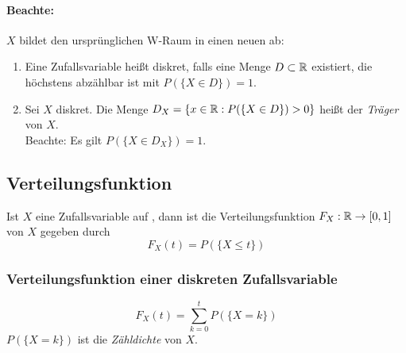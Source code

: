 
\paragraph{Beachte:}
$X$ bildet den ursprünglichen W-Raum in einen neuen ab:
\begin{center}
\end{center}

\begin{definition}
    \begin{enumerate}
        \item Eine Zufallsvariable heißt diskret, falls eine Menge $D \subset \mathbb{R}$
              existiert, die höchstens abzählbar ist mit $P(\{X \in D\})=1$.
        \item Sei $X$ diskret. Die Menge $D_X = \{ x \in \mathbb{R}: P(\{X \in D\})>0 \}$
              heißt der \emph{Träger} von $X$.\\
              Beachte: Es gilt $P(\{X \in D_X \}) = 1$.
    \end{enumerate}
\end{definition}

\subsection{Verteilungsfunktion}

\begin{definition}[Verteilungsfunktion]
    Ist $X$ eine Zufallsvariable auf \wraum, dann ist die Verteilungsfunktion
    $F_X: \mathbb{R} \to [0,1]$ von $X$ gegeben durch
    \begin{equation*}
        F_X(t) = P(\{X \leq t\})
    \end{equation*}
\end{definition}

\subsubsection{Verteilungsfunktion einer diskreten Zufallsvariable}
\begin{equation*}
    F_X(t) = \sum_{k=0}^t P(\{X=k\})
\end{equation*}
$P(\{X=k\})$ ist die \emph{Zähldichte} von $X$.

